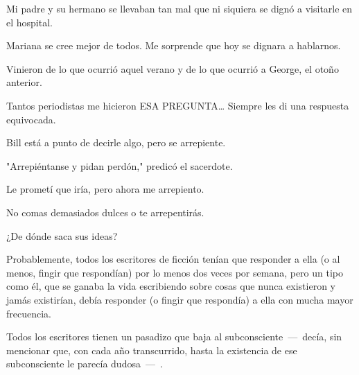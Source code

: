 \sk
Mi padre y su hermano se llevaban tan mal que ni siquiera se dignó a visitarle en el hospital.

\sk
Mariana se cree mejor de todos. Me sorprende que hoy se dignara a hablarnos.

\sk
Vinieron de lo que ocurrió aquel verano y de lo que ocurrió a
George, el otoño anterior.

\sk
Tantos periodistas me
hicieron ESA PREGUNTA\ldots{} Siempre les di una
respuesta equivocada.

\sk
Bill está a punto de decirle algo, pero se arrepiente.

\sk
"Arrepiéntanse y pidan perdón," predicó el sacerdote.

\sk
Le prometí que iría, pero ahora me arrepiento.

\sk
No comas demasiados dulces o te arrepentirás.

\sk
¿De dónde saca sus ideas?

\sk
Probablemente, todos
los escritores de ficción tenían que responder a
ella (o al menos, fingir que respondían) por lo
menos dos veces por semana, pero un tipo como
él, que se ganaba la vida escribiendo sobre cosas
que nunca existieron y jamás existirían, debía
responder (o fingir que respondía) a ella con
mucha mayor frecuencia.

\sk
Todos los escritores tienen un pasadizo que
baja al subconsciente~---~decía, sin mencionar que,
con cada año transcurrido, hasta la existencia de
ese subconsciente le parecía dudosa~---~.

